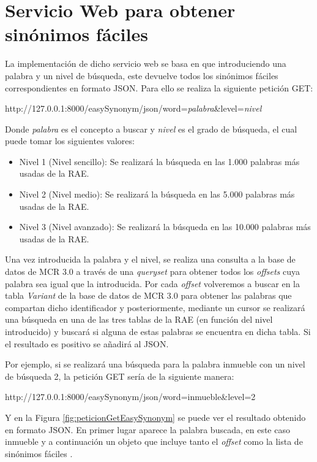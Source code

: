 \section{Servicio Web  para obtener sinónimos fáciles}

La implementación de dicho servicio web se basa en que introduciendo una palabra y un nivel de búsqueda, este devuelve todos los sinónimos fáciles correspondientes en formato JSON. Para ello se realiza la siguiente petición GET:

http://127.0.0.1:8000/easySynonym/json/word=\textit{palabra}\&level=\textit{nivel}

Donde \textit{palabra} es el concepto a buscar y \textit{nivel} es el grado de búsqueda, el cual puede tomar los siguientes valores:
\begin{itemize}
	\item Nivel 1 (Nivel sencillo): Se realizará la búsqueda en las 1.000 palabras más usadas de la RAE.
	\item Nivel 2 (Nivel medio): Se realizará la búsqueda en las 5.000 palabras más usadas de la RAE.
	\item Nivel 3 (Nivel avanzado): Se realizará la búsqueda en las 10.000 palabras más usadas de la RAE.
\end{itemize}

Una vez introducida la palabra y el nivel, se realiza una consulta a la base de datos de MCR 3.0 a través de una \textit{queryset} para obtener todos los \textit{offsets} cuya palabra sea igual que la introducida.
Por cada \textit{offset} volveremos a buscar en la tabla \textit{Variant} de la base de datos de MCR 3.0 para obtener las palabras que compartan dicho identificador y posteriormente, mediante un cursor se realizará una búsqueda en una de las tres tablas de la RAE (en función del nivel introducido) y buscará si alguna de estas palabras se encuentra en dicha tabla.
Si el resultado es positivo se añadirá al JSON.

Por ejemplo, si se realizará una búsqueda para la palabra inmueble con un nivel de búsqueda 2, la petición GET sería de la siguiente manera:

http://127.0.0.1:8000/easySynonym/json/word=inmueble\&level=2

Y en la Figura \ref{fig:peticionGetEasySynonym} se puede ver el resultado obtenido en formato JSON. En primer lugar aparece la palabra buscada, en este caso inmueble y a continuación un objeto que incluye tanto el \textit{offset} como la lista de sinónimos fáciles .


